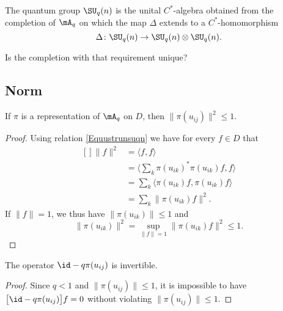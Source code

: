 The quantum group $\SU_q(n)$ is the unital $C^*$-algebra obtained from the completion of $\mA_q$ on which the map $\Delta$ extends to a $C^*$-homomorphism
\begin{equation}
	\Delta\colon \SU_q(n)\to \SU_q(n)\otimes\SU_q(n).
\end{equation}

\begin{probleme}
	Is the completion with that requirement unique?
\end{probleme}

\subsection{Norm}

\begin{proposition}     \label{Propqpiideinve}
	If $\pi$ is a representation of $\mA_q$ on $D$, then $\| \pi(u_{ij}) \|^2\leq 1$.
\end{proposition}

\begin{proof}
	Using relation \eqref{Equustrunsuqn} we have for every $f\in D$ that
	\begin{equation}
		\begin{aligned}[]
			\| f \|^2 & =\langle f, f\rangle                               \\
			          & =\langle \sum_k\pi(u_{ik})^*\pi(u_{ik})f, f\rangle \\
			          & =\sum_k\langle \pi(u_{ik})f, \pi(u_{ik})f\rangle   \\
			          & =\sum_k\| \pi(u_{ik})f \|^2.
		\end{aligned}
	\end{equation}
	If $\| f \|=1$, we thus have $\| \pi(u_{ik}) \|\leq 1$ and
	\begin{equation}
		\| \pi(u_{ik}) \|^2=\sup_{\| f \|=1}\| \pi(u_{ik})f \|^2\leq 1.
	\end{equation}
\end{proof}

\begin{corollary}       \label{CorOpOdquijInverti}
	The operator $\id-q\pi(u_{ij})$ is invertible.
\end{corollary}

\begin{proof}
	Since $q<1$ and $\| \pi(u_{ij}) \|\leq 1$, it is impossible to have $\big[ \id-q\pi(u_{ij}) \big]f=0$ without violating $\| \pi(u_{ij}) \|\leq 1$.
\end{proof}

